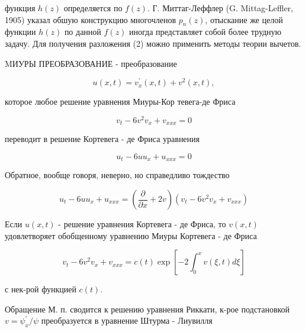 \documentclass[10pt]{article}
\begin{document}
функция $h(z)$ определяется по $f(z)$. Г. Миттаг-Леффлер (G. Mittag-Leffler, 1905) указал обшую конструкцию многочленов $p_{n}(z)$, отыскание же целой функции $h(z)$ по данной $f(z)$ иногда представляет собой более трудную задачу. Для получения разложения (2) можно применить методы теории вычетов.



MИУРЫ ПРЕОБРАЗОВАНИЕ - преобразование



\[

u(x, t)=v_{x}^{\prime}(x, t)+v^{2}(x, t),

\]



которое любое решение уравнения Миуры-Кор тевега-де Фриса



\[

v_{t}-6 v^{2} v_{x}+v_{x x x}=0

\]



переводит в решение Кортевега - де Фриса уравнения



\[

u_{t}-6 u u_{x}+u_{x x x}=0

\]



Обратное, вообще говоря, неверно, но справедливо тождество



\[

u_{t}-6 u u_{x}+u_{x x x}=\left(\frac{\partial}{\partial x}+2 v\right)\left(v_{t}-6 v^{2} v_{x}+v_{x x x}\right)

\]



Если $u(x, t)$ - решение уравнения Кортевега - де Фриса, то $v(x, t)$ удовлетворяет обобщенному уравнению Миуры Кортевега - де Фриса



\[

v_{t}-6 v^{2} v_{x}+v_{x x x}=c(t) \exp \left[-2 \int_{0}^{x} v(\xi, t) d \xi\right]

\]



с нек-рой функцией $c(t)$.



Обращение М. п. сводится к решению уравнения Риккати, к-рое подстановкой $v=\psi_{x}^{\prime} / \psi$ преобразуется в уравнение Штурма - Лиувилля
\end{document}
